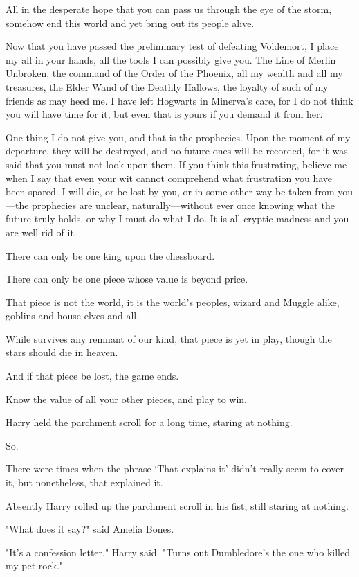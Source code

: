 \begin{writtenNote}
All in the desperate hope that you can pass us through the eye of the
storm, somehow end this world and yet bring out its people alive.

Now that you have passed the preliminary test of defeating Voldemort, I
place my all in your hands, all the tools I can possibly give you. The Line of
Merlin Unbroken, the command of the Order of the Phoenix, all my wealth and all
my treasures, the Elder Wand of the Deathly Hallows, the loyalty of such of
my friends as may heed me. I have left Hogwarts in Minerva's care, for I do not
think you will have time for it, but even that is yours if you demand it from
her.

One thing I do not give you, and that is the prophecies. Upon the moment
of my departure, they will be destroyed, and no future ones will be recorded,
for it was said that you must not look upon them. If you think this
frustrating, believe me when I say that even your wit cannot comprehend what
frustration you have been spared. I will die, or be lost by you, or in some
other way be taken from you---the prophecies are unclear, naturally---without
ever once knowing what the future truly holds, or why I must do what I do. It
is all cryptic madness and you are well rid of it.

There can only be one king upon the chessboard.

There can only be one piece whose value is beyond price.

That piece is not the world, it is the world's peoples, wizard and Muggle
alike, goblins and house-elves and all.

While survives any remnant of our kind, that piece is yet in play, though
the stars should die in heaven.

And if that piece be lost, the game ends.

Know the value of all your other pieces, and play to win.

\end{writtenNote}
\later
Harry held the parchment scroll for a long time, staring at nothing.

So.

There were times when the phrase `That explains it' didn't really seem to cover
it, but nonetheless, that explained it.

Absently Harry rolled up the parchment scroll in his fist, still staring at
nothing.

"What does it say?" said Amelia Bones.

"It's a confession letter," Harry said. "Turns out Dumbledore's the one who
killed my pet rock."

